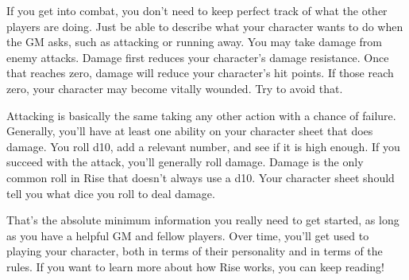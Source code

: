   If you get into combat, you don't need to keep perfect track of what the other players are doing.
  Just be able to describe what your character wants to do when the GM asks, such as attacking or running away.
  You may take damage from enemy attacks.
  Damage first reduces your character's damage resistance.
  Once that reaches zero, damage will reduce your character's hit points.
  If those reach zero, your character may become vitally wounded.
  Try to avoid that.

  Attacking is basically the same taking any other action with a chance of failure.
  Generally, you'll have at least one ability on your character sheet that does damage.
  You roll d10, add a relevant number, and see if it is high enough.
  If you succeed with the attack, you'll generally roll damage.
  Damage is the only common roll in Rise that doesn't always use a d10.
  Your character sheet should tell you what dice you roll to deal damage.

  That's the absolute minimum information you really need to get started, as long as you have a helpful GM and fellow players.
  Over time, you'll get used to playing your character, both in terms of their personality and in terms of the rules.
  If you want to learn more about how Rise works, you can keep reading!
